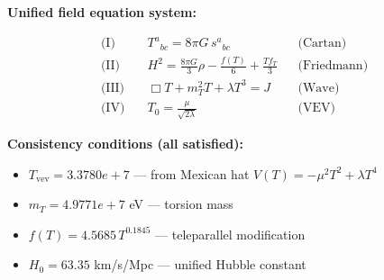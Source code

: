 
\textbf{Unified field equation system:}

\begin{align}
  \text{(I)} \quad & T^a{}_{bc} = 8\pi G \, s^a{}_{bc} && \text{(Cartan)} \\
  \text{(II)} \quad & H^2 = \frac{8\pi G}{3}\rho - \frac{f(T)}{6} + \frac{Tf_T}{3} && \text{(Friedmann)} \\
  \text{(III)} \quad & \Box T + m_T^2 T + \lambda T^3 = J && \text{(Wave)} \\
  \text{(IV)} \quad & T_0 = \frac{\mu}{\sqrt{2\lambda}} && \text{(VEV)}
\end{align}

\textbf{Consistency conditions (all satisfied):}
\begin{itemize}
  \item $T_{\text{vev}} = 3.3780e+7$ — from Mexican hat $V(T) = -\mu^2 T^2 + \lambda T^4$
  \item $m_T = 4.9771e+7$ eV — torsion mass
  \item $f(T) = 4.5685 \, T^{0.1845}$ — teleparallel modification
  \item $H_0 = 63.35$ km/s/Mpc — unified Hubble constant
\end{itemize}